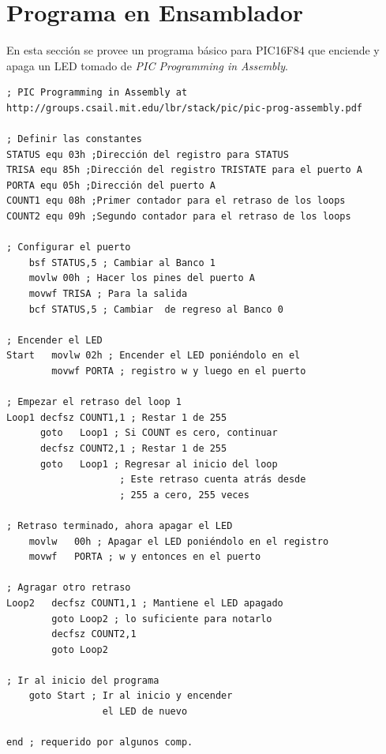\documentclass[conference]{IEEEtran}
\begin{document}
    \section{Programa en Ensamblador}

    En esta sección se provee un programa básico para PIC16F84 que enciende y apaga un LED tomado de \textit{PIC Programming in Assembly}\cite{mit-no-date}.

    \bigbreak

    \begin{lstlisting}[language={[x86masm]Assembler}, caption=Programa en ensamblador para PIC16F84 que enciende y apaga un LED]
; PIC Programming in Assembly at http://groups.csail.mit.edu/lbr/stack/pic/pic-prog-assembly.pdf

; Definir las constantes
STATUS equ 03h ;Dirección del registro para STATUS
TRISA equ 85h ;Dirección del registro TRISTATE para el puerto A
PORTA equ 05h ;Dirección del puerto A
COUNT1 equ 08h ;Primer contador para el retraso de los loops
COUNT2 equ 09h ;Segundo contador para el retraso de los loops

; Configurar el puerto
    bsf STATUS,5 ; Cambiar al Banco 1
    movlw 00h ; Hacer los pines del puerto A
    movwf TRISA ; Para la salida
    bcf STATUS,5 ; Cambiar  de regreso al Banco 0

; Encender el LED
Start   movlw 02h ; Encender el LED poniéndolo en el
        movwf PORTA ; registro w y luego en el puerto

; Empezar el retraso del loop 1
Loop1 decfsz COUNT1,1 ; Restar 1 de 255
      goto   Loop1 ; Si COUNT es cero, continuar
      decfsz COUNT2,1 ; Restar 1 de 255
      goto   Loop1 ; Regresar al inicio del loop
                    ; Este retraso cuenta atrás desde
                    ; 255 a cero, 255 veces

; Retraso terminado, ahora apagar el LED
    movlw   00h ; Apagar el LED poniéndolo en el registro
    movwf   PORTA ; w y entonces en el puerto

; Agragar otro retraso
Loop2   decfsz COUNT1,1 ; Mantiene el LED apagado
        goto Loop2 ; lo suficiente para notarlo
        decfsz COUNT2,1
        goto Loop2

; Ir al inicio del programa
    goto Start ; Ir al inicio y encender
                 el LED de nuevo

end ; requerido por algunos comp.
    \end{lstlisting}

    \bigbreak
\end{document}
